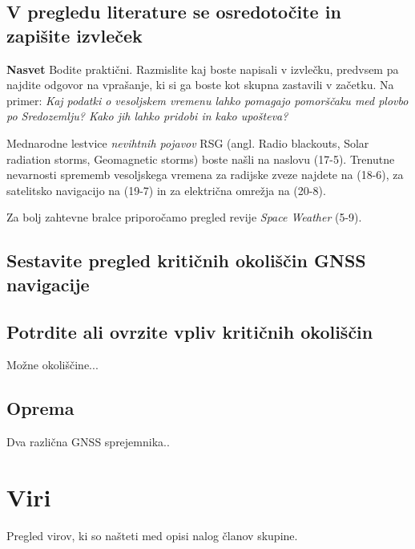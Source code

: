 \subsection{V pregledu literature se osredotočite in zapišite izvleček}
\label{subsec:GnssPrak_ZapIzvlLit}

\textbf{Nasvet} Bodite praktični. Razmislite kaj boste napisali v izvlečku, predvsem pa najdite odgovor na vprašanje, ki si ga boste kot skupna zastavili v začetku. Na primer: \textit{Kaj podatki o vesoljskem vremenu lahko pomagajo pomorščaku med plovbo po Sredozemlju? Kako jih lahko pridobi in kako upošteva?}


Mednarodne lestvice \textit{nevihtnih pojavov} RSG (angl. Radio blackouts, Solar radiation storms, Geomagnetic storms) boste našli na naslovu (17-5). Trenutne nevarnosti sprememb vesoljskega vremena za radijske zveze najdete na (18-6), za satelitsko navigacijo na (19-7) in za električna omrežja na (20-8).



Za bolj zahtevne bralce priporočamo pregled revije \textit{Space Weather} (5-9).

\subsection{Sestavite pregled kritičnih okoliščin GNSS navigacije}
\label{subsec:GnssPrak_Podat}


\subsection{Potrdite ali ovrzite vpliv kritičnih okoliščin}
\label{subsec:GnssPrak_Posk}
Možne okoliščine...


\subsection{Oprema}
\label{subsec:GnssPrak_Oprema}
Dva različna GNSS sprejemnika..

\section{Viri}
\label{sec:GnssPrak_Viri}

Pregled virov, ki so našteti med opisi nalog članov skupine.



